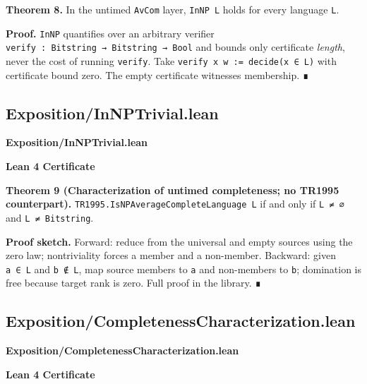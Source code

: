 \documentclass[11pt,a4paper]{article}
\begin{document}
\textbf{Theorem 8.} In the untimed \texttt{AvCom} layer, \texttt{InNP\ L} holds for every language \texttt{L}.

\textbf{Proof.} \texttt{InNP} quantifies over an arbitrary verifier \texttt{verify\ :\ Bitstring\ →\ Bitstring\ →\ Bool} and bounds only certificate \emph{length}, never the cost of running \texttt{verify}. Take \texttt{verify\ x\ w\ :=\ decide(x\ ∈\ L)} with certificate bound zero. The empty certificate witnesses membership. ∎

\hypertarget{exposition-innptrivial-lean}{%
\subsection{Exposition/InNPTrivial.lean}\label{exposition-innptrivial-lean}}

\noindent\textbf{Exposition/InNPTrivial.lean}

\vspace{0.75\baselineskip}
\noindent\textcolor{green!40!black}{\textbf{Lean 4 Certificate}}\par\vspace{0.25\baselineskip}

\vspace{0.75\baselineskip}

\textbf{Theorem 9 (Characterization of untimed completeness; no TR1995 counterpart).} \texttt{TR1995.IsNPAverageCompleteLanguage\ L} if and only if \texttt{L\ ≠\ ∅} and \texttt{L\ ≠\ Bitstring}.

\textbf{Proof sketch.} Forward: reduce from the universal and empty sources using the zero law; nontriviality forces a member and a non-member. Backward: given \texttt{a\ ∈\ L} and \texttt{b\ ∉\ L}, map source members to \texttt{a} and non-members to \texttt{b}; domination is free because target rank is zero. Full proof in the library. ∎

\hypertarget{exposition-completenesscharacterization-lean}{%
\subsection{Exposition/CompletenessCharacterization.lean}\label{exposition-completenesscharacterization-lean}}

\noindent\textbf{Exposition/CompletenessCharacterization.lean}

\vspace{0.75\baselineskip}
\noindent\textcolor{green!40!black}{\textbf{Lean 4 Certificate}}\par\vspace{0.25\baselineskip}

\vspace{0.75\baselineskip}
\end{document}
